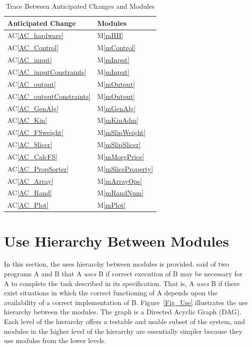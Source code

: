 \documentclass[12pt, titlepage]{article}
\newcommand{\acref}[1]{AC\ref{#1}}
\newcommand{\mref}[1]{M\ref{#1}}
\begin{document}
\begin{table}[h!]
\centering
\begin{tabular}{ll}
\toprule
\textbf{Anticipated Change} & \textbf{Modules}\\
\midrule
\acref{AC_hardware} & \mref{mHH}\\
\acref{AC_Control} & \mref{mControl}\\
\acref{AC_input} & \mref{mInput}\\
\acref{AC_inputConstraints} & \mref{mInput}\\
\acref{AC_output}& \mref{mOutput}\\
\acref{AC_outputConstraints}& \mref{mOutput}\\
\acref{AC_GenAlg}& \mref{mGenAlg}\\
\acref{AC_Kin}& \mref{mKinAdm}\\
\acref{AC_FSweight}& \mref{mSlipWeight}\\
\acref{AC_Slicer} & \mref{mSlipSlicer}\\
\acref{AC_CalcFS} & \mref{mMorgPrice}\\
\acref{AC_PropSorter}& \mref{mSliceProperty}\\
\acref{AC_Array} & \mref{mArrayOps}\\
\acref{AC_Rand} & \mref{mRandNum}\\
\acref{AC_Plot} & \mref{mPlot}\\
\bottomrule
\end{tabular}
\caption{Trace Between Anticipated Changes and Modules}
\label{Table:AC}
\end{table}

\section{Use Hierarchy Between Modules} \label{SecUse}

\hspace{3ex}In this section, the uses hierarchy between modules is
provided. \cite{Parnas1978} said of two programs A and B that A {\em
  uses} B if correct execution of B may be necessary for A to complete
the task described in its specification. That is, A {\em uses} B if
there exist situations in which the correct functioning of A depends
upon the availability of a correct implementation of B. 
Figure~\ref{Fig_Use} illustrates the use hierarchy between the modules. The
graph is a Directed Acyclic Graph (DAG). Each level of the hierarchy
offers a testable and usable subset of the system, and modules in the
higher level of the hierarchy are essentially simpler because they use
modules from the lower levels.
\end{document}
